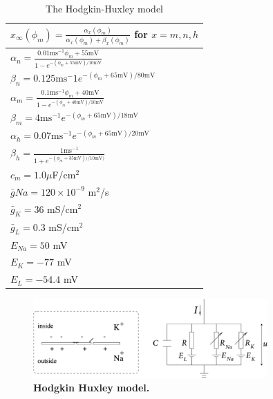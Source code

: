 \begin{table}[h!]
\begin{center}
\caption{The Hodgkin-Huxley model}
\label{tab:HH}
    \begin{tabular}{l}
    \hline
    $x_{\infty}(\phi_m) = \frac{\alpha_x(\phi_m)}{\alpha_x(\phi_m) + \beta_x(\phi_m)}$ for $x = m,n,h$ \\ \hline
    $ \alpha_n = \frac{0.01 \mathrm{ms}^{-1} \phi_m+55 \mathrm{mV}}{1-e^{-(\phi_m+55 \mathrm{mV})/10 \mathrm{mV}}}$  \\ \hline
    $ \beta_n = 0.125 \mathrm{ms}^-1 e^{-(\phi_m+65 \mathrm{mV})/80 \mathrm{mV}} $  \\ \hline
    $ \alpha_m = \frac{0.1 \mathrm{ms}^{-1} \phi_m+ 40 \mathrm{mV}} {1-e^{-(\phi_m+40 \mathrm{mV})/10 \mathrm{mV}}}$  \\ \hline
    $\beta_m = 4 \mathrm{ms}^{-1} e^{-(\phi_m+65  \mathrm{mV})/18 \mathrm{mV}} $  \\ \hline
    $\alpha_h = 0.07 \mathrm{ms}^{-1} e^{-(\phi_m+65 \mathrm{mV})/20 \mathrm{mV}}$  \\ \hline
    $\beta_h = \frac{1 \mathrm{ms}^{-1}}{1+e^{-(\phi_m+35 \mathrm{mV}))/10 \mathrm{mV})}} $  \\ \hline
    $c_m = 1.0 \mu $F/cm$^2$ \\ \hline
    $\bar{g}{Na} = 120\times 10^{-9}$ m$^2$/s\\ \hline
    $\bar{g}_{K} = 36$ mS/cm$^2$ \\ \hline
    $\bar{g}_{L} = 0.3$ mS/cm$^2$ \\ \hline
    $E_{Na} = 50$ mV \\ \hline
    $E_{K} = -77$ mV \\ \hline
    $E_{L} = -54.4$ mV \\ \hline
    \end{tabular}
\end{center}
\end{table}

\begin{figure}[!ht]
\begin{center}
\includegraphics[width=0.8\textwidth]{Figures/Neuron/HHmodel.png}
\end{center}
\caption{\textbf{Hodgkin Huxley model.}
}
\label{Neuron:fig:HHcircuit}
\end{figure}



